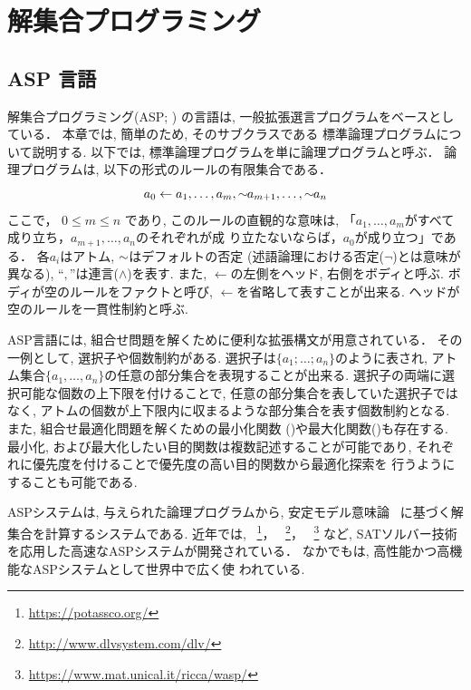 \chapter{解集合プログラミング}\label{chap:asp}


\section{ASP 言語}
解集合プログラミング(ASP; 
\cite{%
  baral03:cambridge,%
  DBLP:conf/iclp/GelfondL88,%
  DBLP:journals/amai/Niemela99})
の言語は, 一般拡張選言プログラムをベースとしている．
本章では, 簡単のため, そのサブクラスである
標準論理プログラムについて説明する. 
以下では, 標準論理プログラムを単に論理プログラムと呼ぶ．
論理プログラムは, 以下の形式のルールの有限集合である．
\begin{displaymath}
  \label{eq:rule}
  a_0\leftarrow a_1,\dots,a_m,{\sim\!\!{a_{m+1}}},\dots,{\sim\!\!{a_n}}
\end{displaymath}
ここで，
$0\leq m\leq n$ であり, 
このルールの直観的な意味は, 
「$a_1,\ldots,a_m$がすべて成り立ち，$a_{m+1},\ldots,a_n$のそれぞれが成
り立たないならば，$a_0$が成り立つ」である．
各$a_i$はアトム, 
${\sim\!\!{}}$はデフォルトの否定 (述語論理における否定($\neg$)とは意味が異なる), 
``$,$''は連言($\land$)を表す. 
また, $\leftarrow$の左側をヘッド, 右側をボディと呼ぶ. 
ボディが空のルールをファクトと呼び, 
$\leftarrow$を省略して表すことが出来る. 
ヘッドが空のルールを一貫性制約と呼ぶ.

ASP言語には, 組合せ問題を解くために便利な拡張構文が用意されている．
その一例として, 選択子や個数制約がある. 
選択子は\(\{a_1;\dots;a_n\}\)のように表され, アトム集合\(\{a_1,\dots,a_n\}\)の任意の部分集合を表現することが出来る. 
選択子の両端に選択可能な個数の上下限を付けることで, 
任意の部分集合を表していた選択子ではなく, 
アトムの個数が上下限内に収まるような部分集合を表す個数制約となる. 
また, 組合せ最適化問題を解くための最小化関数
()や最大化関数()も存在する. 
最小化, および最大化したい目的関数は複数記述することが可能であり, 
それぞれに優先度を付けることで優先度の高い目的関数から最適化探索を
行うようにすることも可能である. 

ASPシステムは, 与えられた論理プログラムから, 
安定モデル意味論~\cite{DBLP:conf/iclp/GelfondL88}
に基づく解集合を計算するシステムである. 
近年では, 
{\clingo}~\footnote{\url{https://potassco.org/}}，
{\dlv}~\footnote{\url{http://www.dlvsystem.com/dlv/}}，
{\wasp}~\footnote{\url{https://www.mat.unical.it/ricca/wasp/}}
など, SATソルバー技術を応用した高速なASPシステムが開発されている．
なかでも{\clingo}は, 高性能かつ高機能なASPシステムとして世界中で広く使
われている. 

